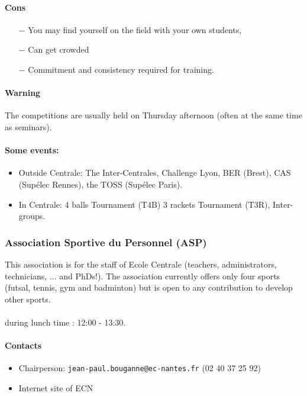 \paragraph{Cons}
\begin{itemize}
  \item [$-$] You may find yourself on the field with your own students,
  \item [$-$] Can get crowded
  \item [$-$] Commitment and consistency required for training.
\end{itemize}

\paragraph{Warning} The competitions are usually held on Thursday afternoon (often at the same time as seminars).


\paragraph{Some events:}
\begin{itemize}
  \item Outside Centrale: The Inter-Centrales, Challenge Lyon, BER (Brest), CAS (Supélec Rennes), the TOSS (Supélec Paris).
  \item In Centrale:  4 balls Tournament (T4B) 3 rackets Tournament (T3R), Inter-groups.
\end{itemize}

\subsubsection {Association Sportive du Personnel (ASP)}
This association is for the staff of Ecole Centrale (teachers, administrators, technicians, ... and PhDs!). The association currently offers only four sports (futsal, tennis, gym and badminton) but is open to any contribution to develop other sports.

\paragraph{} during lunch time : 12:00 - 13:30.
\paragraph{Contacts}
\begin {itemize}
  \item Chairperson: \texttt{jean-paul.bouganne@ec-nantes.fr} (02 40 37 25 92)
  \item Internet site of ECN
\end {itemize}
